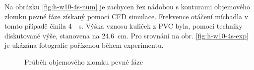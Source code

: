 Na obrázku \ref{fig:h-w10-4s-num} je zachycen řez nádobou s konturami objemového zlomku pevné fáze získaný pomocí CFD simulace. Frekvence otáčení míchadla v tomto případě činila \SI{4}{\per\second}. Výška vznosu kuliček z PVC byla, pomocí techniky diskutované výše, stanovena na \SI{24.6}{\centi\meter}. Pro srovnání na obr. \ref{fig:h-w10-4s-exp} je ukázána fotografie pořízenou během experimentu.

\begin{figure}[h!]
 \centering
  \qquad 
  \caption{Průběh objemového zlomku pevné fáze}
  \label{fig:h-w10-4s}
\end{figure}

